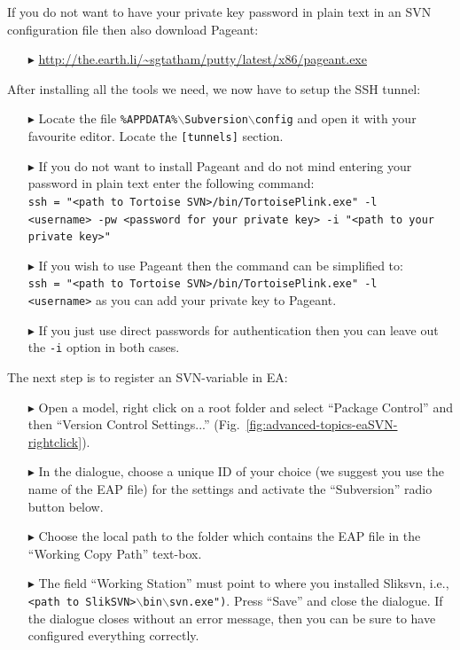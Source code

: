 If you do not want to have your private key password in plain text in an SVN configuration file then also download Pageant:
\begin{enumerate}
  \item[$\blacktriangleright$] {\small \url{http://the.earth.li/~sgtatham/putty/latest/x86/pageant.exe}}  
\end{enumerate}

After installing all the tools we need, we now have to setup the SSH tunnel:
   
\begin{enumerate}
  \item[$\blacktriangleright$] Locate the file \texttt{\%APPDATA\%$\backslash$Subversion$\backslash$config} and open it with your favourite editor. Locate the \texttt{[tunnels]} section.
  \item[$\blacktriangleright$] If you do not want to install Pageant and do not mind entering your password in plain text enter the following command:\\
  \texttt{ssh = "<path to Tortoise SVN>/bin/TortoisePlink.exe" -l \\<username> -pw <password for your private key> -i "<path to your private key>"}
  \item[$\blacktriangleright$] If you wish to use Pageant then the command can be simplified to:\\ \texttt{ssh = "<path to Tortoise SVN>/bin/TortoisePlink.exe" -l \\<username>} as you can add your private key to Pageant.
  \item[$\blacktriangleright$] If you just use direct passwords for authentication then you can leave out the \texttt{-i} option in both cases.
\end{enumerate}


The next step is to register an SVN-variable in EA:
\begin{enumerate}
  \item[$\blacktriangleright$] Open a model, right click on a root folder and select ``Package Control'' and then ``Version Control Settings...'' (Fig.~\ref{fig:advanced-topics-eaSVN-rightclick}).
  \item[$\blacktriangleright$] In the dialogue, choose a unique ID of your choice (we suggest you use the name of the EAP file) for the settings and activate the ``Subversion'' radio button below.
  \item[$\blacktriangleright$] Choose the local path to the folder which contains the EAP file in the ``Working Copy Path'' text-box.
  \item[$\blacktriangleright$] The field ``Working Station'' must point to where you installed Sliksvn, i.e., \texttt{<path to SlikSVN>$\backslash$bin$\backslash$svn.exe")}.  
  Press ``Save'' and close the dialogue.
  If the dialogue closes without an error message, then you can be sure to have configured everything correctly.
\end{enumerate}
 
